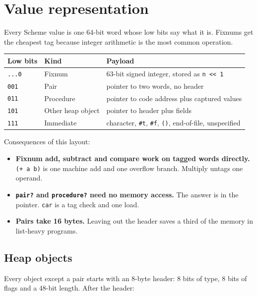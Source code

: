 \documentclass[a4paper,11pt]{article}
\begin{document}
\section{Value representation}

Every Scheme value is one 64-bit word whose low bits say what it is. Fixnums
get the cheapest tag because integer arithmetic is the most common
operation.

\begin{center}
\begin{tabular}{lll}
\hline
Low bits & Kind & Payload \\
\hline
\texttt{...0} & Fixnum & 63-bit signed integer, stored as \texttt{n << 1} \\
\texttt{001} & Pair & pointer to two words, no header \\
\texttt{011} & Procedure & pointer to code address plus captured values \\
\texttt{101} & Other heap object & pointer to header plus fields \\
\texttt{111} & Immediate & character, \texttt{\#t}, \texttt{\#f},
  \texttt{()}, end-of-file, unspecified \\
\hline
\end{tabular}
\end{center}

Consequences of this layout:

\begin{itemize}
\item \textbf{Fixnum add, subtract and compare work on tagged words
  directly.} \texttt{(+ a b)} is one machine add and one overflow branch.
  Multiply untags one operand.
\item \textbf{\texttt{pair?} and \texttt{procedure?} need no memory access.}
  The answer is in the pointer. \texttt{car} is a tag check and one load.
\item \textbf{Pairs take 16 bytes.} Leaving out the header saves a third of
  the memory in list-heavy programs.
\end{itemize}

\subsection{Heap objects}

Every object except a pair starts with an 8-byte header: 8 bits of type,
8 bits of flags and a 48-bit length. After the header:
\end{document}
